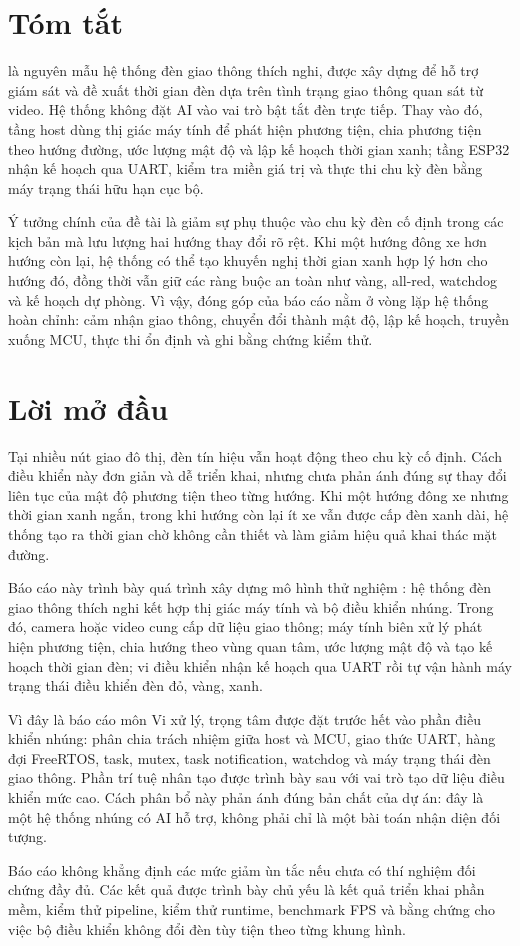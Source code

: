 \section*{Tóm tắt}

\projectname{} là nguyên mẫu hệ thống đèn giao thông thích nghi, được xây dựng để hỗ trợ giám sát và đề xuất thời gian đèn dựa trên tình trạng giao thông quan sát từ video. Hệ thống không đặt AI vào vai trò bật tắt đèn trực tiếp. Thay vào đó, tầng host dùng thị giác máy tính để phát hiện phương tiện, chia phương tiện theo hướng đường, ước lượng mật độ và lập kế hoạch thời gian xanh; tầng ESP32 nhận kế hoạch qua UART, kiểm tra miền giá trị và thực thi chu kỳ đèn bằng máy trạng thái hữu hạn cục bộ.

Ý tưởng chính của đề tài là giảm sự phụ thuộc vào chu kỳ đèn cố định trong các kịch bản mà lưu lượng hai hướng thay đổi rõ rệt. Khi một hướng đông xe hơn hướng còn lại, hệ thống có thể tạo khuyến nghị thời gian xanh hợp lý hơn cho hướng đó, đồng thời vẫn giữ các ràng buộc an toàn như vàng, all-red, watchdog và kế hoạch dự phòng. Vì vậy, đóng góp của báo cáo nằm ở vòng lặp hệ thống hoàn chỉnh: cảm nhận giao thông, chuyển đổi thành mật độ, lập kế hoạch, truyền xuống MCU, thực thi ổn định và ghi bằng chứng kiểm thử.

\section*{Lời mở đầu}

Tại nhiều nút giao đô thị, đèn tín hiệu vẫn hoạt động theo chu kỳ cố định. Cách điều khiển này đơn giản và dễ triển khai, nhưng chưa phản ánh đúng sự thay đổi liên tục của mật độ phương tiện theo từng hướng. Khi một hướng đông xe nhưng thời gian xanh ngắn, trong khi hướng còn lại ít xe vẫn được cấp đèn xanh dài, hệ thống tạo ra thời gian chờ không cần thiết và làm giảm hiệu quả khai thác mặt đường.

Báo cáo này trình bày quá trình xây dựng mô hình thử nghiệm \projectname{}: hệ thống đèn giao thông thích nghi kết hợp thị giác máy tính và bộ điều khiển nhúng. Trong đó, camera hoặc video cung cấp dữ liệu giao thông; máy tính biên xử lý phát hiện phương tiện, chia hướng theo vùng quan tâm, ước lượng mật độ và tạo kế hoạch thời gian đèn; vi điều khiển nhận kế hoạch qua UART rồi tự vận hành máy trạng thái điều khiển đèn đỏ, vàng, xanh.

Vì đây là báo cáo môn Vi xử lý, trọng tâm được đặt trước hết vào phần điều khiển nhúng: phân chia trách nhiệm giữa host và MCU, giao thức UART, hàng đợi FreeRTOS, task, mutex, task notification, watchdog và máy trạng thái đèn giao thông. Phần trí tuệ nhân tạo được trình bày sau với vai trò tạo dữ liệu điều khiển mức cao. Cách phân bổ này phản ánh đúng bản chất của dự án: đây là một hệ thống nhúng có AI hỗ trợ, không phải chỉ là một bài toán nhận diện đối tượng.

Báo cáo không khẳng định các mức giảm ùn tắc nếu chưa có thí nghiệm đối chứng đầy đủ. Các kết quả được trình bày chủ yếu là kết quả triển khai phần mềm, kiểm thử pipeline, kiểm thử runtime, benchmark FPS và bằng chứng cho việc bộ điều khiển không đổi đèn tùy tiện theo từng khung hình.
